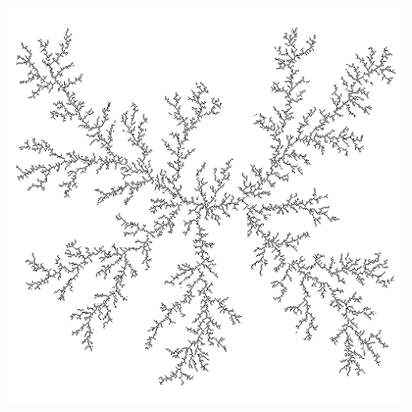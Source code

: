 \documentclass[usenames, dvipsnames, aspectratio=169]{beamer}
\begin{document}
{\begin{frame}[fragile]{}{}
\begin{minipage}{.32\textwidth}
    \end{minipage}%
    \hfill
    \begin{minipage}{.32\textwidth}
      \includegraphics[width=\textwidth]{DLA_3}
    \end{minipage}

    \vfill
  \end{frame}
}
\end{document}
